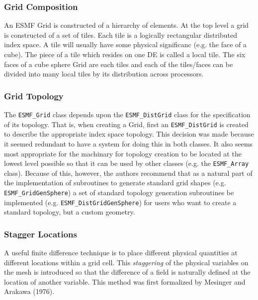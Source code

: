 

\subsubsection{Grid Composition}\label{sec:gridcomp}
  An ESMF Grid is constructed of a hierarchy of elements. At the top
level a grid is constructed of a set of tiles. Each tile is a logically
rectangular distributed index space. A tile will usually have some
physical significanc (e.g. the face of a cube). The piece of a tile
which resides on one DE is called a local tile. The six faces of a
cube sphere Grid are each tiles and each of 
the tiles/faces can be divided into many local tiles by its distribution 
across processors. 


\subsubsection{Grid Topology} 

The {\tt ESMF\_Grid} class depends upon the {\tt ESMF\_DistGrid} class
for the specification of its topology. That is, when 
creating a Grid, first an {\tt ESMF\_DistGrid} is created to describe the 
appropriate index space topology. This decision was
made because it seemed redundant to have a system for doing this
in both classes. It also seems most appropriate for
the machinary for topology creation to be located at the lowest
level possible so that it can be used by other
classes (e.g. the {\tt ESMF\_Array} class). Because of this, however,
the authors recommend that as a natural part of the 
implementation of subroutines to generate standard grid shapes
(e.g. {\tt ESMF\_GridGenSphere}) a set of standard
topology generation subroutines be implemented (e.g. {\tt ESMF\_DistGridGenSphere}) for users who want to create a standard topology, but a custom geometry.


\subsubsection{Stagger Locations}\label{ref:stagger}
A useful finite difference technique is to place different physical quantities at different locations within a grid cell. This {\em {staggering}} of the physical variables on the mesh is introduced so that the difference of a field is naturally defined at the location of another variable. This method was first formalized by Mesinger and Arakawa (1976).


